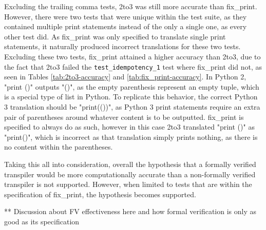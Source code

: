 Excluding the trailing comma tests, 2to3 was still more accurate than fix\_print. However, there were two tests that were unique within the test suite, as they contained multiple print statements instead of the only a single one, as every other test did. As fix\_print was only specified to translate single print statements, it naturally produced incorrect translations for these two tests. Excluding these two tests, fix\_print attained a higher accuracy than 2to3, due to the fact that 2to3 failed the \verb|test_idempotency_1| test where fix\_print did not, as seen in Tables \ref{tab:2to3-accuracy} and \ref{tab:fix_print-accuracy}. In Python 2, "print ()" outputs "()", as the empty parenthesis represent an empty tuple, which is a special type of list in Python. To replicate this behavior, the correct Python 3 translation should be "print(())", as Python 3 print statements require an extra pair of parentheses around whatever content is to be outputted. fix\_print is specified to always do as such, however in this case 2to3 translated "print ()" as "print()", which is incorrect as that translation simply prints nothing, as there is no content within the parentheses.

Taking this all into consideration, overall the hypothesis that a formally verified transpiler would be more computationally accurate than a non-formally verified transpiler is not supported. However, when limited to tests that are within the specification of fix\_print, the hypothesis becomes supported.

** Discussion about FV effectiveness here and how formal verification is only as good as its specification

